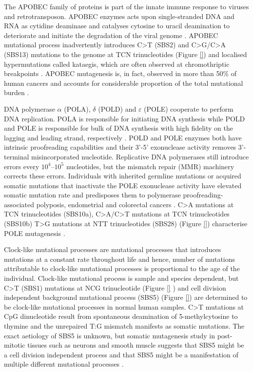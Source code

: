 The APOBEC family of proteins is part of the innate immune response to viruses and retrotransposon. APOBEC enzymes acts upon single-stranded DNA and RNA as cytidine deaminase and catalyses cytosine to uracil deamination to deteriorate and initiate the degradation of the viral genome \cite{}. APOBEC mutational process inadvertently introduces C>T (SBS2) and C>G/C>A (SBS13) mutations to the genome at TCN trinucleotides (Figure \ref{}) \cite{} and localised hypermutations called kataegis, which are often observed at chromothriptic breakpoints \cite{}. APOBEC mutagenesis is, in fact, observed in more than 50\% of human cancers and accounts for considerable proportion of the total mutational burden \cite{}.

DNA polymerase $\alpha$ (POLA), $\delta$ (POLD) and $\varepsilon$ (POLE) cooperate to perform DNA replication. POLA is responsible for initiating DNA synthesis while POLD and POLE is responsible for bulk of DNA synthesis with high fidelity on the lagging and leading strand, respectively \cite{}. POLD and POLE enzymes both have intrinsic proofreading capabilities and their 3’-5’ exonuclease activity removes 3’-terminal misincorporated nucleotide. Replicative DNA polymerases still introduce errors every $10^4 – 10^5$ nucleotides, but the mismatch repair (MMR) machinery corrects these errors. Individuals with inherited germline mutations or acquired somatic mutations that inactivate the POLE exonuclease activity have elevated somatic mutation rate and predisposes them to polymerase proofreading-associated polyposis, endometrial and colorectal cancers \cite{}. C>A mutations at TCN trinucleotides (SBS10a), C>A/C>T mutations at TCN trinucleotides (SBS10b) T>G mutations at NTT trinucleotides (SBS28) (Figure \ref{}) characterise POLE mutagenesis \cite{}. 

Clock-like mutational processes are mutational processes that introduces mutations at a constant rate throughout life and hence, number of mutations attributable to clock-like mutational processes is proportional to the age of the individual.  Clock-like mutational process is sample and species dependent, but C>T (SBS1) mutations at NCG trinucleotide (Figure \ref{} ) and cell division independent background mutational process (SBS5) (Figure \ref{}) \cite{} are determined to be clock-like mutational processes in normal human samples. C>T mutations at CpG dinucleotide result from spontaneous deamination of 5-methylcytosine to thymine and the unrepaired T:G mismatch manifests as somatic mutations. The exact aetiology of SBS5 is unknown, but somatic mutagenesis study in post-mitotic tissues such as neurons and smooth muscle suggests that SBS5 might be a cell division independent process and that SBS5 might be a manifestation of multiple different mutational processes \cite{}.

